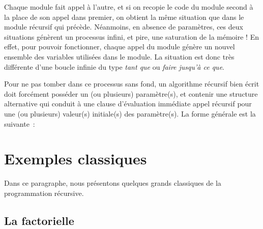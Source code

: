 	

	Chaque module fait appel à l'autre, et si on recopie le code 
	du module second à la place de son appel dans premier, on
	obtient la même situation que dans le module récursif qui 
	précède. Néanmoins, en absence de paramètres, ces deux
	situations génèrent un processus infini, et pire, une 
	saturation de la mémoire ! En effet, pour pouvoir fonctionner,
	chaque appel du module génère un nouvel ensemble des variables 
	utilisées dans le module. La situation est donc très
	différente d'une boucle infinie du type \textit{tant que} 
	ou \textit{faire jusqu'à ce que}.

	Pour ne pas tomber dans ce processus sans fond, un algorithme 
	récursif bien écrit doit forcément posséder un (ou plusieurs) 
	paramètre(s), et contenir une structure alternative qui conduit 
	à une clause d'évaluation immédiate  appel récursif pour une 
	(ou plusieurs) valeur(s) initiale(s) des paramètre(s). 
	La forme générale est la suivante~:


\section{Exemples classiques}

	Dans ce paragraphe, nous présentons quelques grands 
	classiques de la programmation récursive.


	\subsection{La factorielle}

